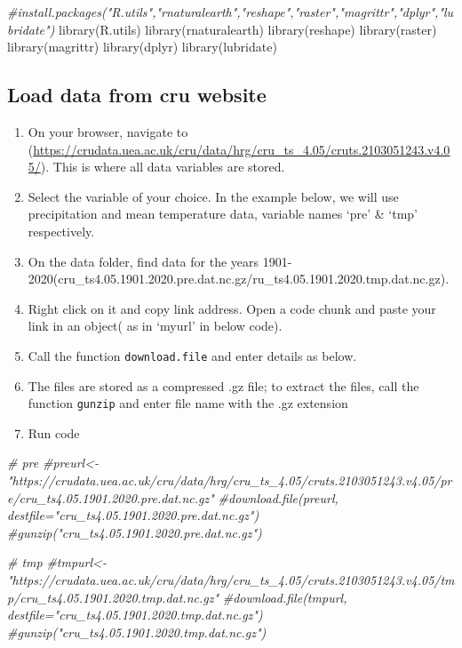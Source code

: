 \documentclass[
]{book}
\newenvironment{Shaded}{\begin{snugshade}}{\end{snugshade}}
\newcommand{\CommentTok}[1]{\textcolor[rgb]{0.56,0.35,0.01}{\textit{#1}}}
\newcommand{\FunctionTok}[1]{\textcolor[rgb]{0.00,0.00,0.00}{#1}}
\newcommand{\NormalTok}[1]{#1}
\providecommand{\tightlist}{%
  \setlength{\itemsep}{0pt}\setlength{\parskip}{0pt}}
\begin{document}
\begin{Shaded}
\begin{Highlighting}[]
\CommentTok{\#install.packages("R.utils","rnaturalearth","reshape","raster","magrittr","dplyr","lubridate")}
\FunctionTok{library}\NormalTok{(R.utils)}
\FunctionTok{library}\NormalTok{(rnaturalearth)}
\FunctionTok{library}\NormalTok{(reshape)}
\FunctionTok{library}\NormalTok{(raster)}
\FunctionTok{library}\NormalTok{(magrittr)}
\FunctionTok{library}\NormalTok{(dplyr)}
\FunctionTok{library}\NormalTok{(lubridate)}
\end{Highlighting}
\end{Shaded}

\hypertarget{load-data-from-cru-website}{%
\subsection{Load data from cru website}\label{load-data-from-cru-website}}

\begin{enumerate}
\def\labelenumi{\arabic{enumi}.}
\tightlist
\item
  On your browser, navigate to (\url{https://crudata.uea.ac.uk/cru/data/hrg/cru_ts_4.05/cruts.2103051243.v4.05/}). This is where all data variables are stored.
\item
  Select the variable of your choice. In the example below, we will use precipitation and mean temperature data, variable names `pre' \& `tmp' respectively.
\item
  On the data folder, find data for the years 1901-2020(cru\_ts4.05.1901.2020.pre.dat.nc.gz/ru\_ts4.05.1901.2020.tmp.dat.nc.gz).
\item
  Right click on it and copy link address. Open a code chunk and paste your link in an object( as in `myurl' in below code).
\item
  Call the function \texttt{download.file} and enter details as below.
\item
  The files are stored as a compressed .gz file; to extract the files, call the function \texttt{gunzip} and enter file name with the .gz extension
\item
  Run code
\end{enumerate}

\begin{Shaded}
\begin{Highlighting}[]
\CommentTok{\# pre}
\CommentTok{\#preurl\textless{}{-} "https://crudata.uea.ac.uk/cru/data/hrg/cru\_ts\_4.05/cruts.2103051243.v4.05/pre/cru\_ts4.05.1901.2020.pre.dat.nc.gz"}
\CommentTok{\#download.file(preurl, destfile="cru\_ts4.05.1901.2020.pre.dat.nc.gz")}
\CommentTok{\#gunzip("cru\_ts4.05.1901.2020.pre.dat.nc.gz")}

\CommentTok{\# tmp}
\CommentTok{\#tmpurl\textless{}{-} "https://crudata.uea.ac.uk/cru/data/hrg/cru\_ts\_4.05/cruts.2103051243.v4.05/tmp/cru\_ts4.05.1901.2020.tmp.dat.nc.gz"}
\CommentTok{\#download.file(tmpurl, destfile="cru\_ts4.05.1901.2020.tmp.dat.nc.gz")}
\CommentTok{\#gunzip("cru\_ts4.05.1901.2020.tmp.dat.nc.gz")}
\end{Highlighting}
\end{Shaded}
\end{document}
